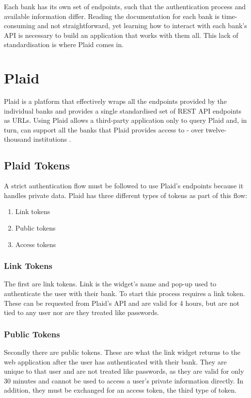 Each bank has its own set of endpoints, such that the authentication process and available information differ. Reading the documentation for each bank is time-consuming and not straightforward, yet learning how to interact with each bank's API is necessary to build an application that works with them all. This lack of standardisation is where Plaid \cite{Plaid} comes in.

\section{Plaid}
\label{sec:plaid}
Plaid is a platform that effectively wraps all the endpoints provided by the individual banks and provides a single standardised set of REST API endpoints as URLs. Using Plaid allows a third-party application only to query Plaid and, in turn, can support all the banks that Plaid provides access to - over twelve-thousand institutions \cite{PlaidInstitutions}.

\subsection{Plaid Tokens}
A strict authentication flow must be followed to use Plaid's endpoints because it handles private data. Plaid has three different types of tokens as part of this flow:

\begin{enumerate}
    \item Link tokens
    \item Public tokens
    \item Access tokens
\end{enumerate}

\subsubsection{Link Tokens}
The first are link tokens. Link is the widget's name and pop-up used to authenticate the user with their bank. To start this process requires a link token. These can be requested from Plaid's API and are valid for 4 hours, but are not tied to any user nor are they treated like passwords.

\subsubsection{Public Tokens}
Secondly there are public tokens. These are what the link widget returns to the web application after the user has authenticated with their bank. They are unique to that user and are not treated like passwords, as they are valid for only 30 minutes and cannot be used to access a user's private information directly. In addition, they must be exchanged for an access token, the third type of token.

